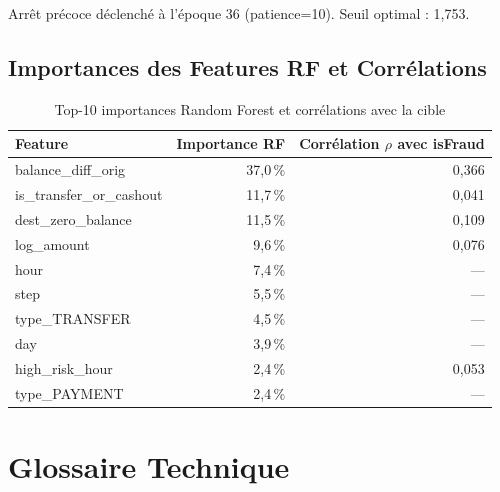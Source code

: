 \documentclass[12pt,a4paper,twoside]{report}
\theoremstyle{definition}
\begin{document}
Arrêt précoce déclenché à l'époque 36 (patience=10). Seuil optimal : 1,753.

\section{Importances des Features RF et Corrélations}

\begin{table}[H]
\centering
\caption{Top-10 importances Random Forest et corrélations avec la cible}
\label{tab:feature_importances}
\renewcommand{\arraystretch}{1.3}
\begin{tabular}{lrr}
\toprule
\textbf{Feature} & \textbf{Importance RF} & \textbf{Corrélation $\rho$ avec isFraud} \\
\midrule
balance\_diff\_orig & 37,0\,\% & 0,366 \\
is\_transfer\_or\_cashout & 11,7\,\% & 0,041 \\
dest\_zero\_balance & 11,5\,\% & 0,109 \\
log\_amount & 9,6\,\% & 0,076 \\
hour & 7,4\,\% & --- \\
step & 5,5\,\% & --- \\
type\_TRANSFER & 4,5\,\% & --- \\
day & 3,9\,\% & --- \\
high\_risk\_hour & 2,4\,\% & 0,053 \\
type\_PAYMENT & 2,4\,\% & --- \\
\bottomrule
\end{tabular}
\end{table}

\chapter{Glossaire Technique}
\end{document}
